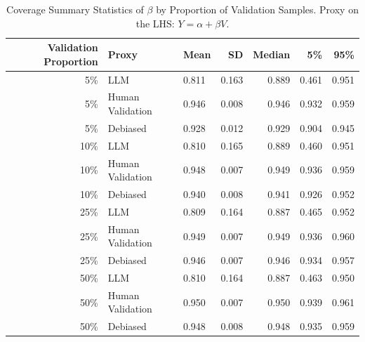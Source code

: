\begin{table}

\caption{\label{tab:unnamed-chunk-2}Coverage Summary Statistics of $\beta$ by Proportion of Validation Samples. Proxy on the LHS: $Y = \alpha + \beta V$.}
\centering
\begin{tabular}[t]{rllrrrr}
\toprule
Validation Proportion & Proxy & Mean & SD & Median & 5\% & 95\%\\
\midrule
5\% & LLM & 0.811 & 0.163 & 0.889 & 0.461 & 0.951\\
5\% & Human Validation & 0.946 & 0.008 & 0.946 & 0.932 & 0.959\\
5\% & Debiased & 0.928 & 0.012 & 0.929 & 0.904 & 0.945\\
10\% & LLM & 0.810 & 0.165 & 0.889 & 0.460 & 0.951\\
10\% & Human Validation & 0.948 & 0.007 & 0.949 & 0.936 & 0.959\\
10\% & Debiased & 0.940 & 0.008 & 0.941 & 0.926 & 0.952\\
25\% & LLM & 0.809 & 0.164 & 0.887 & 0.465 & 0.952\\
25\% & Human Validation & 0.949 & 0.007 & 0.949 & 0.936 & 0.960\\
25\% & Debiased & 0.946 & 0.007 & 0.946 & 0.934 & 0.957\\
50\% & LLM & 0.810 & 0.164 & 0.887 & 0.463 & 0.950\\
50\% & Human Validation & 0.950 & 0.007 & 0.950 & 0.939 & 0.961\\
50\% & Debiased & 0.948 & 0.008 & 0.948 & 0.935 & 0.959\\
\bottomrule
\end{tabular}
\end{table}
